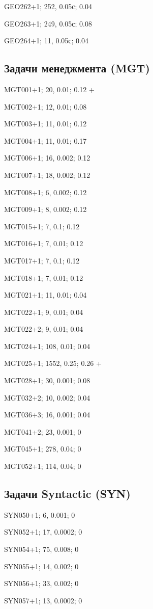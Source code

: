 GEO262+1; 252, 0.05с; 0.04

GEO263+1; 249, 0.05с; 0.08

GEO264+1; 11, 0.05с; 0.04


\subsection*{Задачи менеджмента (MGT)}

MGT001+1; 20, 0.01; 0.12 +

MGT002+1; 12, 0.01; 0.08

MGT003+1; 11, 0.01; 0.12

MGT004+1; 11, 0.01; 0.17

MGT006+1; 16, 0.002; 0.12

MGT007+1; 18, 0.002; 0.12

MGT008+1; 6, 0.002; 0.12

MGT009+1; 8, 0.002; 0.12

MGT015+1; 7, 0.1; 0.12

MGT016+1; 7, 0.01; 0.12

MGT017+1; 7, 0.1; 0.12

MGT018+1; 7, 0.01; 0.12

MGT021+1; 11, 0.01; 0.04

MGT022+1; 9, 0.01; 0.04

MGT022+2; 9, 0.01; 0.04

MGT024+1; 108, 0.01; 0.04

MGT025+1; 1552, 0.25; 0.26 +

MGT028+1; 30, 0.001; 0.08

MGT032+2; 10, 0.002; 0.04

MGT036+3; 16, 0.001; 0.04

MGT041+2; 23, 0.001; 0

MGT045+1; 278, 0.04; 0

MGT052+1; 114, 0.04; 0

\subsection{Задачи Syntactic (SYN)}

SYN050+1; 6, 0.001; 0

SYN052+1; 17, 0.0002; 0

SYN054+1; 75, 0.008; 0

SYN055+1; 14, 0.002; 0

SYN056+1; 33, 0.002; 0

SYN057+1; 13, 0.0002; 0

